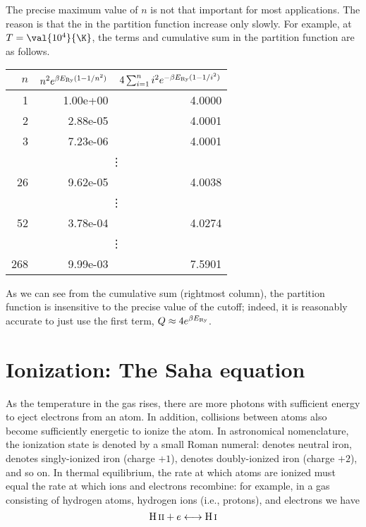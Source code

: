 \begin{sidebar}
The precise maximum value of $n$ is not that important for most applications. The reason is that the in the partition function increase only slowly. For example, at $T=\val{10^{4}}{\K}$, the terms and cumulative sum in the partition function are as follows.
\begin{center}
\begin{tabular}{rrr}
$n$ & $n^{2} e^{\beta E_{\mathrm{Ry}}(1-1/n^{2})}$ & $4\sum_{i=1}^{n} i^{2}e^{-\beta E_{\mathrm{Ry}}(1-1/i^{2})}$ \\
\hline
   1 & 1.00e+00 &  4.0000 \\
   2 & 2.88e-05 &  4.0001 \\
   3 & 7.23e-06 &  4.0001 \\
  \multicolumn{3}{c}{\vdots} \\
  26 & 9.62e-05 &  4.0038 \\
  \multicolumn{3}{c}{\vdots} \\
  52 & 3.78e-04 &  4.0274 \\
  \multicolumn{3}{c}{\vdots} \\
 268 & 9.99e-03 &  7.5901 \\
\end{tabular}
\end{center}
As we can see from the cumulative sum (rightmost column), the partition function is insensitive to the precise value of the cutoff; indeed, it is reasonably accurate to just use the first term, $Q\approx 4e^{\beta E_{\mathrm{Ry}}}$. 
\end{sidebar}

\section{Ionization: The Saha equation}
\label{s.saha-eqn}

As the temperature in the gas rises, there are more photons with sufficient energy to eject electrons from an atom. In addition, collisions between atoms also become sufficiently energetic to ionize the atom. In astronomical nomenclature, the ionization state is denoted by a small Roman numeral:  denotes neutral iron,  denotes singly-ionized iron (charge $+1$),  denotes doubly-ionized iron (charge $+2$), and so on. In thermal equilibrium, the rate at which atoms are ionized must equal the rate at which ions and electrons recombine: for example, in a gas consisting of hydrogen atoms, hydrogen ions (i.e., protons), and electrons we have
\[
	\mathrm{H}\,\textrm{\scshape ii} + e \longleftrightarrow \mathrm{H}\,\textrm{\scshape i}
\]


